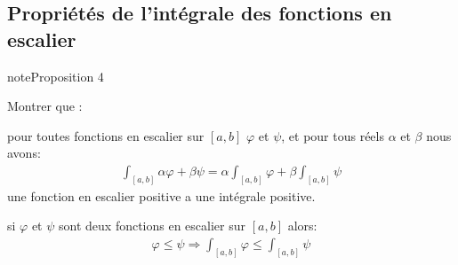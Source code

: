 \documentclass[letterpaper,10pt,french]{sphinxmanual}
\begin{document}
\subsection{Propriétés de l’intégrale des fonctions en escalier}
\label{\detokenize{fe:proprietes-de-l-integrale-des-fonctions-en-escalier}}
\begin{sphinxadmonition}{note}{Proposition 4}

\sphinxAtStartPar
Montrer que :

\sphinxhyphen{} pour toutes fonctions en escalier sur \([a, b]\) \(\varphi\) et \(\psi\), et pour tous réels \(\alpha\) et \(\beta\) nous avons:
\begin{equation*}
\begin{split}
\int_{[a, b]}\alpha\varphi + \beta\psi = \alpha\int_{[a, b]}\varphi + \beta\int_{[a, b]}\psi
\end{split}
\end{equation*}
\sphinxhyphen{} une fonction en escalier positive a une intégrale positive.

\sphinxhyphen{} si  \(\varphi\) et \(\psi\) sont deux fonctions en escalier sur \([a, b]\) alors:
\begin{equation*}
\begin{split}
\varphi \leq \psi \Rightarrow  \int_{[a, b]}\varphi \leq \int_{[a, b]}\psi
\end{split}
\end{equation*}\end{sphinxadmonition}
\end{document}
